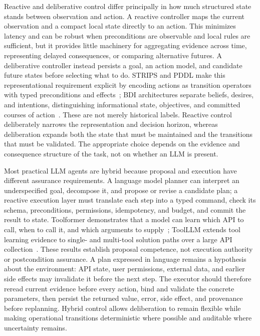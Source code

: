 Reactive and deliberative control differ principally in how much structured state stands between observation and action. A reactive controller maps the current observation and a compact local state directly to an action. This minimizes latency and can be robust when preconditions are observable and local rules are sufficient, but it provides little machinery for aggregating evidence across time, representing delayed consequences, or comparing alternative futures. A deliberative controller instead persists a goal, an action model, and candidate future states before selecting what to do. STRIPS and PDDL make this representational requirement explicit by encoding actions as transition operators with typed preconditions and effects~\cite{fikes1971strips,mcdermott1998pddl}; BDI architectures separate beliefs, desires, and intentions, distinguishing informational state, objectives, and committed courses of action~\cite{rao1995bdi}. These are not merely historical labels. Reactive control deliberately narrows the representation and decision horizon, whereas deliberation expands both the state that must be maintained and the transitions that must be validated. The appropriate choice depends on the evidence and consequence structure of the task, not on whether an LLM is present.

Most practical LLM agents are hybrid because proposal and execution have different assurance requirements. A language model planner can interpret an underspecified goal, decompose it, and propose or revise a candidate plan; a reactive execution layer must translate each step into a typed command, check its schema, preconditions, permissions, idempotency, and budget, and commit the result to state. Toolformer demonstrates that a model can learn which API to call, when to call it, and which arguments to supply~\cite{schick2023toolformer}; ToolLLM extends tool learning evidence to single- and multi-tool solution paths over a large API collection~\cite{qin2024toolllm}. These results establish proposal competence, not execution authority or postcondition assurance. A plan expressed in language remains a hypothesis about the environment: API state, user permissions, external data, and earlier side effects may invalidate it before the next step. The executor should therefore reread current evidence before every action, bind and validate the concrete parameters, then persist the returned value, error, side effect, and provenance before replanning. Hybrid control allows deliberation to remain flexible while making operational transitions deterministic where possible and auditable where uncertainty remains.

